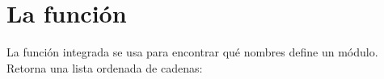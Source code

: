 \documentclass[a4,10pt,spanish]{sphinxmanual}
\begin{document}
\begin{sphinxVerbatim}[commandchars=\\\{\}]
 
\end{sphinxVerbatim}


\section{La función }
\label{\detokenize{tutorial/modules:the-dir-function}}\label{\detokenize{tutorial/modules:tut-dir}}
\sphinxAtStartPar
La función integrada  se usa para encontrar qué nombres define un módulo.  Retorna una lista ordenada de cadenas:
\end{document}
